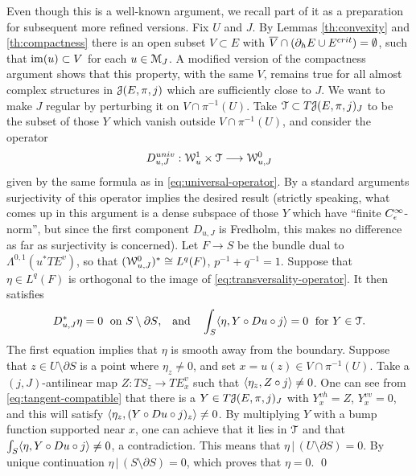 \documentclass[10pt,letterpaper]{article}
\begin{document}
\proof Even though this is a well-known argument, we recall part of it as a
preparation for subsequent more refined versions. Fix $U$ and $J$. By Lemmas
\ref{th:convexity} and \ref{th:compactness} there is an open subset $V \subset
E$ with $\overline{V} \cap (\partial_hE \cup E^{crit}) = \emptyset$, such that
$\mathrm{im}(u) \subset V$ for each $u \in \mathcal{M}_J$. A modified version of the
compactness argument shows that this property, with the same $V$, remains true
for all almost complex structures in $\mathcal{J}(E,\pi,j)$ which are sufficiently
close to $J$. We want to make $J$ regular by perturbing it on $V \cap
\pi^{-1}(U)$. Take $\mathcal{T} \subset T\mathcal{J}(E,\pi,j)_J$ to be the subset of those $Y$
which vanish outside $V \cap \pi^{-1}(U)$, and consider the operator
\begin{equation} \label{eq:transversality-operator}
 D_{u,J}^{univ}: \mathcal{W}^1_u \times \mathcal{T} \longrightarrow \mathcal{W}^0_{u,J}
\end{equation}
given by the same formula as in \eqref{eq:universal-operator}. By a standard
arguments surjectivity of this operator implies the desired result (strictly
speaking, what comes up in this argument is a dense subspace of those $Y$ which
have ``finite $C^\infty_\epsilon$-norm'', but since the first component
$D_{u,J}$ is Fredholm, this makes no difference as far as surjectivity is
concerned). Let $F \rightarrow S$ be the bundle dual to
$\Lambda^{0,1}(u^*TE^v)$, so that $(\mathcal{W}^0_{u,J})^* \cong L^q(F)$, $p^{-1} +
q^{-1} = 1$. Suppose that $\eta \in L^q(F)$ is orthogonal to the image of
\eqref{eq:transversality-operator}. It then satisfies
\begin{equation} \label{eq:adjoint}
 D_{u,J}^*\eta = 0 \; \text{ on $S \setminus \partial S$,} \quad
 \text{and} \quad \int_S \langle \eta, Y \circ Du \circ j \rangle = 0
 \; \text{ for $Y \in \mathcal{T}$.}
\end{equation}
The first equation implies that $\eta$ is smooth away from the boundary.
Suppose that $z \in U \setminus \partial S$ is a point where $\eta_z \neq 0$,
and set $x = u(z) \in V \cap \pi^{-1}(U)$. Take a $(j,J)$-antilinear map $Z:
TS_z \rightarrow TE^v_x$ such that $\langle \eta_z, Z \circ j \rangle \neq 0$.
One can see from \eqref{eq:tangent-compatible} that there is a $Y \in
T\mathcal{J}(E,\pi,j)_J$ with $Y^{vh}_x = Z$, $Y^{vv}_x = 0$, and this will satisfy
$\langle \eta_z, (Y \circ Du \circ j)_z \rangle \neq 0$. By multiplying $Y$
with a bump function supported near $x$, one can achieve that it lies in $\mathcal{T}$
and that $\int_S \langle \eta, Y \circ Du \circ j \rangle \neq 0$, a
contradiction. This means that $\eta\,|\, (U \setminus \partial S) = 0$. By
unique continuation $\eta\,|\,(S \setminus \partial S) = 0$, which proves that
$\eta = 0$. \qed
\end{document}
